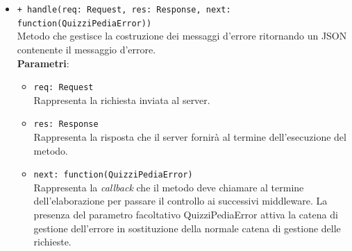 \begin{itemize}
	\begin{itemize}
		\item \texttt{+ handle(req: Request, res: Response, next: function(QuizziPediaError))}\\
		Metodo che gestisce la costruzione dei messaggi d'errore ritornando un JSON contenente il messaggio d'errore.\\
		\textbf{Parametri}:
		\begin{itemize}
			\item \texttt{req: Request}\\
			Rappresenta la richiesta inviata al server.
			\item \texttt{res: Response}\\
			Rappresenta la risposta che il server fornirà al termine dell'esecuzione del metodo.
			\item \texttt{next: function(QuizziPediaError)}\\
			Rappresenta la \textit{callback} che il metodo deve chiamare al termine dell'elaborazione per passare il controllo ai successivi middleware. La presenza del parametro facoltativo QuizziPediaError attiva la catena di gestione dell'errore in sostituzione della normale catena di gestione delle richieste.
		\end{itemize}
	\end{itemize}
\end{itemize}

